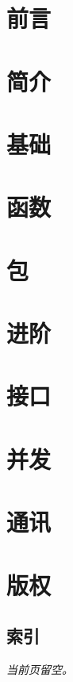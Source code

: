 \documentclass[a4paper,twoside,openleft]{blocksbook}
\begin{document}
\chapter*{前言}
\label{chap:preface}


\chapter{简介}
\label{chap:intro}


\chapter{基础}
\label{chap:basics}


\chapter{函数}
\label{chap:functions}


\chapter{包}
\label{chap:packages}


\chapter{进阶}
\label{chap:beyond}


\chapter{接口}
\label{chap:interfaces}


\chapter{并发}
\label{chap:channels}


\chapter{通讯}
\label{chap:communication}



\appendix

\chapter{版权}


\begin{twocolumn}
\chapter{索引}
\printindex
\end{twocolumn}
\begin{onecolumn}



\newpage
\thispagestyle{empty}
\begin{center}
\emph{当前页留空。}
\end{center}
\end{onecolumn}
\end{document}
